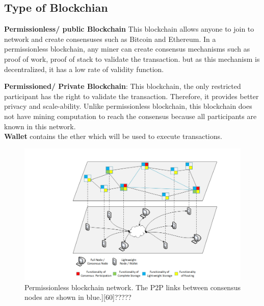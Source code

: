 \subsection{Type of Blockchian}

\textbf{Permissionless/ public Blockchain} This blockchain allows anyone to join to network and create consensuses such as Bitcoin and Ethereum. In a permissionless blockchain, any miner can create consensus mechanisms such as proof of work, proof of stack to validate the transaction. but as this mechanism is decentralized, it has a low rate of validity function\cite{Kalra}.

\textbf{Permissioned/ Private Blockchain}: This blockchain, the only restricted participant has the right to validate the transaction. Therefore, it provides better privacy and scale-ability. Unlike permissionless blockchain, this blockchain does not have mining computation to reach the consensus because all participants are known in this network\cite{Kalra}. \\
\textbf{Wallet} contains the ether which will be used to execute transactions\cite{Egbertsen}. \\
\begin{center}
	\begin{figure}[htb!]
		
		\begin{minipage}{0.45\linewidth}
			\centering
			\includegraphics[width=1.85\textwidth]{images/chap01_P2P.png}
		\end{minipage}
		\caption{Permissionless blockchain network. The P2P links between consensus nodes are shown in blue.]{[60]?????}}
		
	\end{figure}
	
\end{center}

